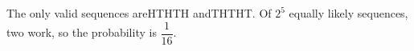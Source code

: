 The only valid sequences areHTHTH andTHTHT. Of $2^5$ equally likely sequences, two work, so the probability is $\boxed{\dfrac{1}{16}}$.
